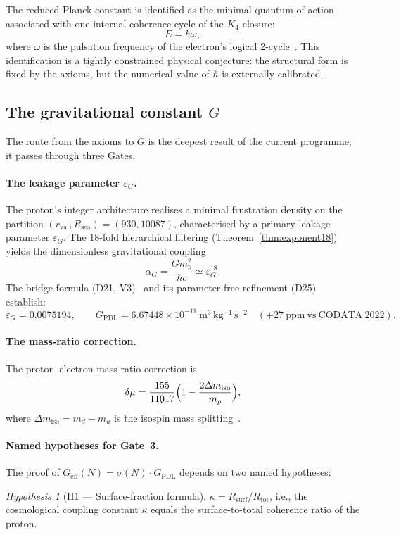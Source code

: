 \documentclass[11pt,a4paper]{article}
\theoremstyle{plain}
\theoremstyle{definition}
\theoremstyle{remark}
\newtheorem{hypothesis}[theorem]{Hypothesis}
\newcommand{\Kfour}{K_4}
\newcommand{\Geff}{G_{\mathrm{eff}}}
\newcommand{\GPDL}{G_{\mathrm{PDL}}}
\newcommand{\epsG}{\varepsilon_G}
\newcommand{\rval}{r_{\mathrm{val}}}
\newcommand{\Rsurf}{R_{\mathrm{surf}}}
\newcommand{\Rtot}{R_{\mathrm{tot}}}
\newcommand{\sigmaN}{\sigma(N)}
\begin{document}
The reduced Planck constant is identified as the minimal quantum of action associated with one internal coherence cycle of the $\Kfour$ closure:
\[
E = \hbar\omega,
\]
where $\omega$ is the pulsation frequency of the electron's logical 2-cycle~\citep{D01,D02}.
This identification is a \textcolor{conjecturegreen}{tightly constrained physical conjecture}: the structural form is fixed by the axioms, but the numerical value of $\hbar$ is externally calibrated.

\subsection{The gravitational constant \texorpdfstring{$G$}{G}}
\label{subsec:G}

The route from the axioms to $G$ is the deepest result of the current programme; it passes through three Gates.

\paragraph{The leakage parameter $\epsG$.}
The proton's integer architecture realises a minimal frustration density on the partition $(\rval, R_{\mathrm{sea}}) = (930, 10087)$, characterised by a primary leakage parameter $\epsG$.
The 18-fold hierarchical filtering (Theorem~\ref{thm:exponent18}) yields the dimensionless gravitational coupling
\[
\alpha_G = \frac{G m_p^2}{\hbar c} \simeq \epsG^{18}.
\]
The bridge formula (D21, V3)~\citep{D21} and its parameter-free refinement (D25)~\citep{D25} establish:
\[
\epsG = 0.0075194, \qquad \GPDL = 6.67448\times 10^{-11}~\mathrm{m^3\,kg^{-1}\,s^{-2}} \quad (+27~\mathrm{ppm~vs~CODATA~2022}).
\]

\paragraph{The mass-ratio correction.}
The proton--electron mass ratio correction is
\[
\delta\mu = \frac{155}{11017}\Bigl(1 - \frac{2\Delta m_{\mathrm{iso}}}{m_p}\Bigr),
\]
where $\Delta m_{\mathrm{iso}} = m_d - m_u$ is the isospin mass splitting~\citep{D28}.

\paragraph{Named hypotheses for Gate~3.}
The proof of $\Geff(N)=\sigmaN\cdot\GPDL$ depends on two named hypotheses:

\begin{hypothesis}[H1 — Surface-fraction formula]
$\kappa = \Rsurf/\Rtot$, i.e., the cosmological coupling constant $\kappa$ equals the surface-to-total coherence ratio of the proton.
\end{hypothesis}
\end{document}
